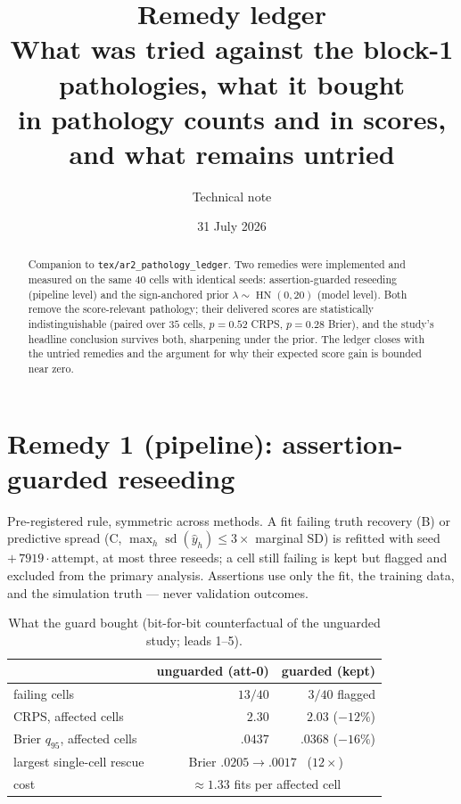 \documentclass[11pt]{article}
\title{\textbf{Remedy ledger}\\[2pt]
\large What was tried against the block-1 pathologies, what it bought\\
in pathology counts and in scores, and what remains untried}
\author{Technical note}
\date{31 July 2026}
\newcommand{\code}[1]{\texttt{#1}}
\DeclareMathOperator{\hn}{HN}
\DeclareMathOperator{\sd}{sd}
\begin{document}
\maketitle

\begin{abstract}
Companion to \code{tex/ar2\_pathology\_ledger}. Two remedies were
implemented and measured on the same $40$ cells with identical seeds:
assertion-guarded reseeding (pipeline level) and the sign-anchored prior
$\lambda \sim \hn(0, 20)$ (model level). Both remove the score-relevant
pathology; their delivered scores are statistically indistinguishable
(paired over $35$ cells, $p = 0.52$ CRPS, $p = 0.28$ Brier), and the
study's headline conclusion survives both, sharpening under the prior.
The ledger closes with the untried remedies and the argument for why
their expected score gain is bounded near zero.
\end{abstract}

\section{Remedy 1 (pipeline): assertion-guarded reseeding}

Pre-registered rule, symmetric across methods. A fit failing truth
recovery (B) or predictive spread (C, $\max_h \sd(\hat y_h) \le 3 \times$
marginal SD) is refitted with seed $+\,7919\cdot\text{attempt}$, at most
three reseeds; a cell still failing is kept but flagged and excluded
from the primary analysis. Assertions use only the fit, the training
data, and the simulation truth --- never validation outcomes.

\begin{table}[ht]
\centering
\caption{What the guard bought (bit-for-bit counterfactual of the
unguarded study; leads 1--5).}
\label{tab:guard}
\begin{tabular}{lrr}
\toprule
 & unguarded (att-0) & guarded (kept) \\
\midrule
failing cells                 & $13/40$ & $3/40$ flagged \\
CRPS, affected cells          & $2.30$  & $2.03$ \quad ($-12\%$) \\
Brier $q_{95}$, affected cells& $.0437$ & $.0368$ \quad ($-16\%$) \\
largest single-cell rescue    & \multicolumn{2}{c}{Brier $.0205 \to .0017$ \ ($12\times$)} \\
cost                          & \multicolumn{2}{c}{$\approx 1.33$ fits per affected cell} \\
\bottomrule
\end{tabular}
\end{table}
\end{document}
